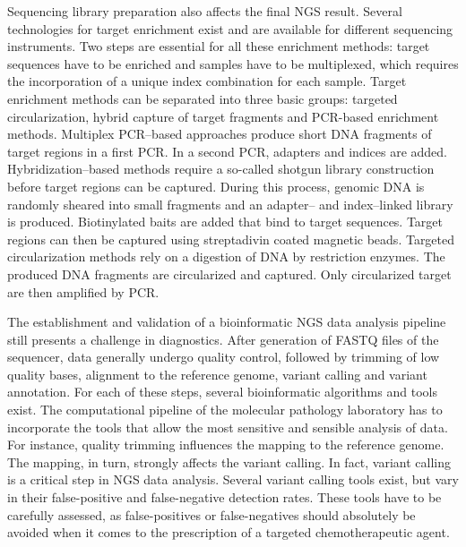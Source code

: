 {{      Sequencing library preparation also affects the final NGS result. Several
      technologies for target enrichment exist and are available for different
      sequencing instruments. Two steps are essential for all these enrichment
      methods: target sequences have to be enriched and samples have to be
      multiplexed, which requires the incorporation of a unique index
      combination for each sample. Target enrichment methods can be separated
      into three basic groups: targeted circularization, hybrid capture of
      target fragments and PCR-based enrichment methods. Multiplex PCR--based
      approaches produce short DNA fragments of target regions in a first PCR.
      In a second PCR, adapters and indices are added. Hybridization--based
      methods require a so-called shotgun library construction before target
      regions can be captured. During this process, genomic DNA is randomly
      sheared into small fragments and an adapter-- and index--linked library is
      produced. Biotinylated baits are added that bind to target sequences.
      Target regions can then be captured using streptadivin coated magnetic
      beads. Targeted circularization methods rely on a digestion of DNA by
      restriction enzymes. The produced DNA fragments are circularized and
      captured. Only circularized target are then amplified by PCR.

      The establishment and validation of a bioinformatic NGS data analysis
      pipeline still presents a challenge in diagnostics. After generation of
      FASTQ files of the sequencer, data generally undergo quality control,
      followed by trimming of low quality bases, alignment to the reference
      genome, variant calling and variant annotation. For each of these steps,
      several bioinformatic algorithms and tools exist. The computational
      pipeline of the molecular pathology laboratory has to incorporate the
      tools that allow the most sensitive and sensible analysis of data. For
      instance, quality trimming influences the mapping to the reference genome.
      The mapping, in turn, strongly affects the variant calling. In fact,
      variant calling is a critical step in NGS data analysis. Several variant
      calling tools exist, but vary in their false-positive and false-negative
      detection rates. These tools have to be carefully assessed, as
      false-positives or false-negatives should absolutely be avoided when it
      comes to the prescription of a targeted chemotherapeutic agent.

}}
